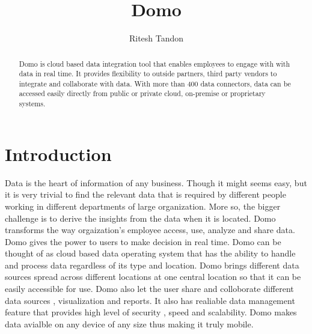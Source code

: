 
\title{Domo}

\author{Ritesh Tandon}


\renewcommand{\shortauthors}{R. Tandon}


\begin{abstract}

Domo is cloud based data integration tool that enables employees 
to engage with with data in real time. It provides flexibility 
to outside partners, third party vendors to integrate
and collaborate with data. With more than 400 data connectors, data 
can be accessed easily directly from public or private cloud, 
on-premise or proprietary systems.

\end{abstract}


\maketitle


\section{Introduction}

Data is the heart of information of any business. 
Though it might seems easy, but it is very trivial 
to find the relevant data that is required by different 
people working in different departments of large organization. 
More so, the bigger challenge is to derive the insights 
from the data when it is located.
Domo transforms the way orgaization's employee access, use, 
analyze and share data. Domo gives the power to users to 
make decision in real time. Domo can be thought of as cloud 
based data operating system that has the ability to handle 
and process data regardless of its type and location. 
Domo brings different data sources spread across different 
locations at one central location so that it can be easily 
accessible for use. Domo also let the user share and 
colloborate different data sources , visualization and 
reports. It also has realiable data management feature 
that provides high level of security , speed and scalability. 
Domo makes data avialble on any device of any size thus 
making it truly mobile.

